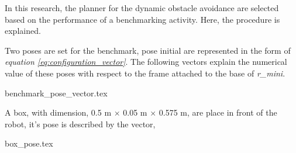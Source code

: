 \documentclass[a4paper, 10pt]{article}
\newcommand\thisPaperDir{/home/asl/version-control/ws_thesis/writing_papers/resampling_planning_in_dynamic_environment}
\numberwithin{equation}{section} %
\newcommand\rimini[0]{\textit{r\_mini}} %
\begin{document}
In this research, the planner for the dynamic obstacle
avoidance are selected based on the performance of a benchmarking
activity. Here, the procedure is explained.

Two poses are set for the benchmark, pose initial are represented in the 
form of \textit{equation \ref{eq:configuration_vector}}. 
The following vectors explain the numerical
value of these poses with respect to the frame attached to the base
of \rimini.

{benchmark_pose_vector.tex}

A box, with dimension, 0.5 m $\times$ 0.05 m $\times$ 0.575 m, are place
in front of the robot, it's pose is described by the vector,

{box_pose.tex}
\end{document}
